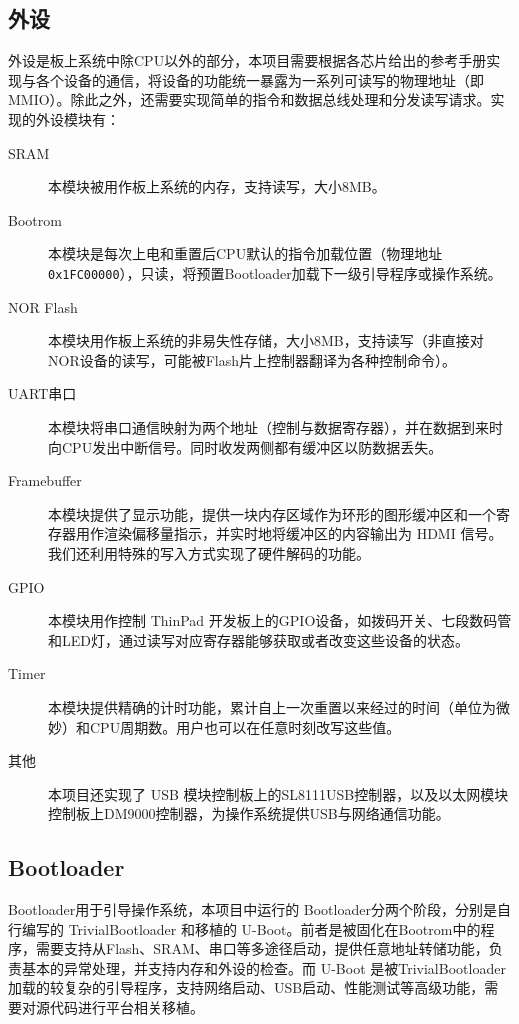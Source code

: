 \subsection{外设}

外设是板上系统中除CPU以外的部分，本项目需要根据各芯片给出的参考手册实现与各个设备的通信，将设备的功能统一暴露为一系列可读写的物理地址（即MMIO）。除此之外，还需要实现简单的指令和数据总线处理和分发读写请求。实现的外设模块有：

\begin{description}

    \item[SRAM] 本模块被用作板上系统的内存，支持读写，大小8MB。
    \item[Bootrom] 本模块是每次上电和重置后CPU默认的指令加载位置（物理地址 \texttt{0x1FC00000}），只读，将预置Bootloader加载下一级引导程序或操作系统。
    \item[NOR Flash] 本模块用作板上系统的非易失性存储，大小8MB，支持读写（非直接对NOR设备的读写，可能被Flash片上控制器翻译为各种控制命令）。
    \item[UART串口] 本模块将串口通信映射为两个地址（控制与数据寄存器），并在数据到来时向CPU发出中断信号。同时收发两侧都有缓冲区以防数据丢失。
    \item[Framebuffer] 本模块提供了显示功能，提供一块内存区域作为环形的图形缓冲区和一个寄存器用作渲染偏移量指示，并实时地将缓冲区的内容输出为 HDMI 信号。我们还利用特殊的写入方式实现了硬件解码的功能。
    \item[GPIO] 本模块用作控制 ThinPad 开发板上的GPIO设备，如拨码开关、七段数码管和LED灯，通过读写对应寄存器能够获取或者改变这些设备的状态。
    \item[Timer] 本模块提供精确的计时功能，累计自上一次重置以来经过的时间（单位为微妙）和CPU周期数。用户也可以在任意时刻改写这些值。
    \item[其他] 本项目还实现了 USB 模块控制板上的SL8111USB控制器，以及以太网模块控制板上DM9000控制器，为操作系统提供USB与网络通信功能。

\end{description}

\subsection{Bootloader}

Bootloader用于引导操作系统，本项目中运行的 Bootloader分两个阶段，分别是自行编写的 TrivialBootloader 和移植的 U-Boot。前者是被固化在Bootrom中的程序，需要支持从Flash、SRAM、串口等多途径启动，提供任意地址转储功能，负责基本的异常处理，并支持内存和外设的检查。而 U-Boot 是被TrivialBootloader加载的较复杂的引导程序，支持网络启动、USB启动、性能测试等高级功能，需要对源代码进行平台相关移植。

